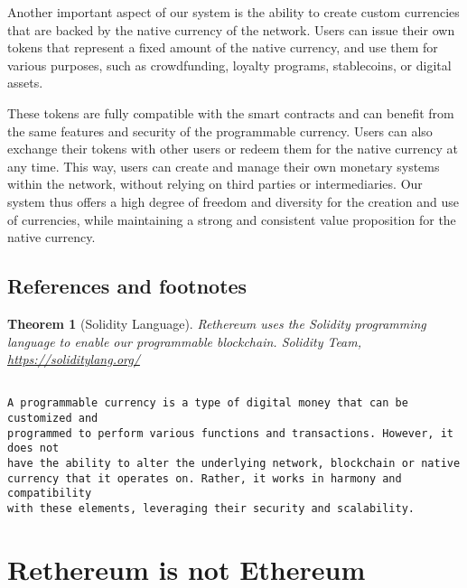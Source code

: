 \documentclass[a4paper,onecolumn, superscriptaddress,10pt,accepted=2020-05-01,issue=1, volume=2, shorttitle=papers]{compositionalityarticle}
\newtheorem{theorem}{Theorem}
\begin{document}
\vspace{0.3cm}

Another important aspect of our system is the ability to create custom currencies that are backed by the native currency of the network. Users can issue their own tokens that represent a fixed amount of the native currency, and use them for various purposes, such as crowdfunding, loyalty programs, stablecoins, or digital assets. 

\vspace{0.3cm}

These tokens are fully compatible with the smart contracts and can benefit from the same features and security of the programmable currency. Users can also exchange their tokens with other users or redeem them for the native currency at any time. This way, users can create and manage their own monetary systems within the network, without relying on third parties or intermediaries. Our system thus offers a high degree of freedom and diversity for the creation and use of currencies, while maintaining a strong and consistent value proposition for the native currency.

\vspace{0.5cm}

\newpage

\subsection{References and footnotes}
\label{sec:subsec1}

\begin{theorem}[Solidity Language]
  Rethereum uses the Solidity programming language to enable our programmable blockchain.
   Solidity Team,
  \href{https://soliditylang.org/}
       {https://soliditylang.org/}
\end{theorem}
\begin{verbatim}

A programmable currency is a type of digital money that can be customized and 
programmed to perform various functions and transactions. However, it does not 
have the ability to alter the underlying network, blockchain or native 
currency that it operates on. Rather, it works in harmony and compatibility 
with these elements, leveraging their security and scalability.
\end{verbatim}
\vspace{2cm}

\section{Rethereum is not Ethereum}
\end{document}
